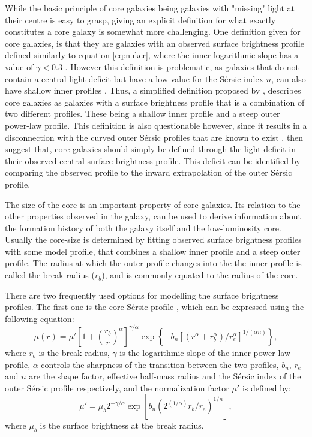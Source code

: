 \documentclass[english, twoside]{HYgradu}
\begin{document}
While the basic principle of core galaxies being galaxies with "missing" light at their centre is easy to grasp, giving an explicit definition for what exactly constitutes a core galaxy is somewhat more challenging. One definition given for core galaxies, is that they are galaxies with an observed surface brightness profile defined similarly to equation \ref{eq:nuker}, where the inner logarithmic slope has a value of $\gamma < 0.3$ \citep{Lauer1995, Lauer2007}. However this definition is problematic, as galaxies that do not contain a central light deficit but have a low value for the Sérsic index $n$, can also have shallow inner profiles \citep{Graham2003}. Thus, a simplified definition proposed by \cite{Kormendy1999}, describes core galaxies as galaxies with a surface brightness profile that is a combination of two different profiles. These being a shallow inner profile and a steep outer power-law profile. This definition is also questionable however, since it results in a disconnection with the curved outer Sérsic profiles that are known to exist \citep{Dullo2012}. \cite{Graham2003} then suggest that, core galaxies should simply be defined through the light deficit in their observed central surface brightness profile. This deficit can be identified by comparing the observed profile to the inward extrapolation of the outer Sérsic profile.

The size of the core is an important property of core galaxies. Its relation to the other properties observed in the galaxy, can be used to derive information about the formation history of both the galaxy itself and the low-luminosity core. Usually the core-size is determined by fitting observed surface brightness profiles with some model profile, that combines a shallow inner profile and a steep outer profile. The radius at which the outer profile changes into the the inner profile is called the break radius ($r_b$), and is commonly equated to the radius of the core.

There are two frequently used options for modelling the surface brightness profiles. The first one is the core-Sérsic profile \citep{Graham2003}, which can be expressed using the following equation:
\begin{equation}
\mu(r) = \mu' \left[ 1 + \left( \frac{r_b}{r} \right)^\alpha \right]^{\gamma / \alpha} \exp \left\lbrace -b_n \left[ \left( r^\alpha + r_b^\alpha \right) / r_e^\alpha \right]^{1/(\alpha n)} \right\rbrace, \label{eq:core-sersic}
\end{equation}
where $r_b$ is the break radius, $\gamma$ is the logarithmic slope of the inner power-law profile, $\alpha$ controls the sharpness of the transition between the two profiles, $b_n$, $r_e$ and $n$ are the shape factor, effective half-mass radius and the Sérsic index of the outer Sérsic profile respectively, and the normalization factor $\mu'$ is defined by:
\begin{equation}
\mu' = \mu_b 2^{-\gamma/\alpha} \exp \left[ b_n \left( 2^{(1/\alpha)} r_b/r_e \right)^{1/n} \right], 
\label{eq:mu_dot}
\end{equation}
where $\mu_b$ is the surface brightness at the break radius. 
\end{document}
